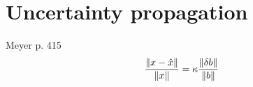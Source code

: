 \section{Uncertainty propagation}

Meyer p. 415
\begin{equation}
  \frac{\left\lVert x-\hat{x}\right\rVert}{\left\lVert x\right\rVert} = \kappa \frac{\left\lVert\delta b\right\rVert}{\left\lVert b\right\rVert}
\end{equation}


\endinput